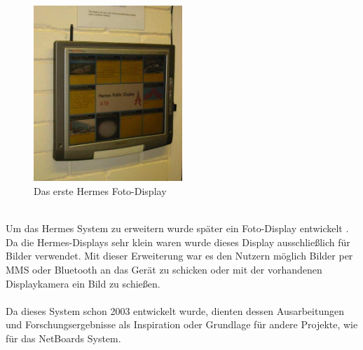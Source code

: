 \begin{figure}[h!]
  \centering
  \includegraphics[width=0.5\textwidth]{./img/hermes_photoDisplay_short.png}
  \caption{Das erste Hermes Foto-Display \cite{cheverest:2012}}
  \label{img:hermesPhotoDisplay}
\end{figure}
\\
Um das Hermes System zu erweitern wurde später ein Foto-Display  entwickelt \cite{cheveres:2005:hermes-bluetooth}. Da die Hermes-Displays sehr klein waren wurde dieses Display ausschließlich für Bilder verwendet.
Mit dieser Erweiterung war es den Nutzern möglich Bilder per MMS oder Bluetooth an das Gerät zu schicken oder mit der vorhandenen Displaykamera ein Bild zu schießen.
\\
\\
Da dieses System schon 2003 entwickelt wurde, dienten dessen Ausarbeitungen und Forschungsergebnisse als Inspiration oder Grundlage für andere Projekte, wie \bspw für das NetBoards System. 

